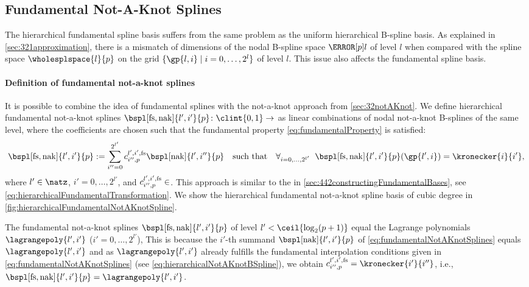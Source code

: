 \subsection{Fundamental Not-A-Knot Splines}
\label{sec:445fundamentalNotAKnotSplines}

The hierarchical fundamental spline basis suffers from the same problem
as the uniform hierarchical B-spline basis.
As explained in \cref{sec:321approximation}, there is a mismatch
of dimensions of the nodal B-spline space $\nsbspl{l}{p}$ of level $l$
when compared with the spline space $\wholesplspace{l}{p}$ on the grid
$\{\gp{l,i} \mid i = 0, \dotsc, 2^l\}$ of level $l$.
This issue also affects the fundamental spline basis.

\paragraph{Definition of fundamental not-a-knot splines}

It is possible to combine the idea of fundamental splines
with the not-a-knot approach from \cref{sec:32notAKnot}.
We define hierarchical fundamental not-a-knot splines
$\bspl[\fs,\nak]{l',i'}{p}\colon \clint{0, 1} \to \real$ as
linear combinations of nodal not-a-knot B-splines of the same level,
where the coefficients are chosen such that the
fundamental property \eqref{eq:fundamentalProperty} is satisfied:
\begin{equation}
  \label{eq:fundamentalNotAKnotSplines}
  \bspl[\fs,\nak]{l',i'}{p}
  := \sum_{i''=0}^{2^{l'}}
  \fundsplcoeff[l',i',\fs]{i''}{p} \bspl[\nak]{l',i''}{p}
  \quad\text{such that}\quad
  \falarge{i = 0, \dotsc, 2^{l'}}{
    \bspl[\fs,\nak]{l',i'}{p}(\gp{l',i}) = \kronecker{i}{i'}
  },
\end{equation}
where $l' \in \natz$, $i' = 0, \dotsc, 2^{l'}$, and
$\fundsplcoeff[l',i',\fs]{i''}{p} \in \real$.
This approach is similar to the \hftr in
\cref{sec:442constructingFundamentalBases},
see \cref{eq:hierarchicalFundamentalTransformation}.
We show the hierarchical fundamental not-a-knot spline basis
of cubic degree in \cref{fig:hierarchicalFundamentalNotAKnotSpline}.

The fundamental not-a-knot splines $\bspl[\fs,\nak]{l',i'}{p}$
of level $l' < \ceil{\log_2(p+1)}$ equal the Lagrange polynomials
$\lagrangepoly{l',i'}$ ($i' = 0, \dotsc, 2^{l'}$),
This is because the $i'$-th summand $\bspl[\nak]{l',i'}{p}$
of \eqref{eq:fundamentalNotAKnotSplines} equals $\lagrangepoly{l',i'}$ and
as $\lagrangepoly{l',i'}$ already fulfills the
fundamental interpolation conditions given in
\eqref{eq:fundamentalNotAKnotSplines}
(see \cref{eq:hierarchicalNotAKnotBSpline}),
we obtain $\fundsplcoeff[l',i',\fs]{i''}{p} = \kronecker{i'}{i''}$, i.e.,
$\bspl[\fs,\nak]{l',i'}{p} = \lagrangepoly{l',i'}$.


